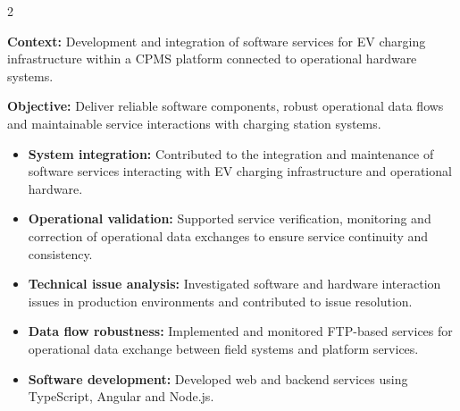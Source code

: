 \documentclass[8pt,a4paper,ragged2e,withhyper]{altacv}
\begin{document}



\makecvheader

\vspace{-0.3cm}


\begin{paracol}{2}



\textbf{Context:} Development and integration of software services for EV charging infrastructure within a CPMS platform connected to operational hardware systems.

\textbf{Objective:} Deliver reliable software components, robust operational data flows and maintainable service interactions with charging station systems.

\begin{itemize}
\item \textbf{System integration:} Contributed to the integration and maintenance of software services interacting with EV charging infrastructure and operational hardware.
\item \textbf{Operational validation:} Supported service verification, monitoring and correction of operational data exchanges to ensure service continuity and consistency.
\item \textbf{Technical issue analysis:} Investigated software and hardware interaction issues in production environments and contributed to issue resolution.
\item \textbf{Data flow robustness:} Implemented and monitored FTP-based services for operational data exchange between field systems and platform services.
\item \textbf{Software development:} Developed web and backend services using TypeScript, Angular and Node.js.
\end{itemize}


\end{paracol}
\end{document}
